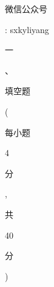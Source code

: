 \documentclass[10pt]{article}
\begin{document}
\begin{CJK}{UTF8}{mj}微信公众号\end{CJK}: sxkyliyang

\begin{CJK}{UTF8}{mj}一\end{CJK}、\begin{CJK}{UTF8}{mj}填空题\end{CJK}(\begin{CJK}{UTF8}{mj}每小题\end{CJK} 4 \begin{CJK}{UTF8}{mj}分\end{CJK}, \begin{CJK}{UTF8}{mj}共\end{CJK} 40 \begin{CJK}{UTF8}{mj}分\end{CJK})
\end{document}
